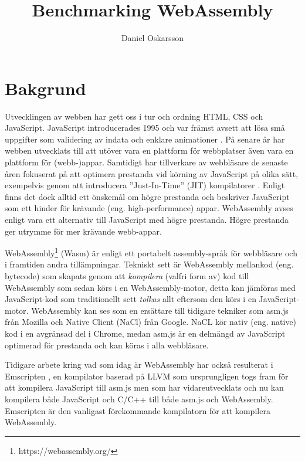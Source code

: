 \documentclass[swedish,template=rapport]{his}
\title{Benchmarking WebAssembly}
\subtitle{}
\author{Daniel Oskarsson}
\begin{document}
\maketitle

\tableofcontents

\clearpage


\section{Bakgrund}

Utvecklingen av webben har gett oss i tur och ordning HTML, CSS och JavaScript. JavaScript introducerades 1995 och var främst avsett att lösa små uppgifter som validering av indata och enklare animationer \parencite{Moller2018}. På senare år har webben utvecklats till att utöver vara en plattform för webbplatser även vara en plattform för (webb-)appar. Samtidigt har tillverkare av webbläsare de senaste åren fokuserat på att optimera prestanda vid körning av JavaScript på olika sätt, exempelvis genom att introducera ''Just-In-Time'' (JIT) kompilatorer \parencite{HerreraChenLavoieHendren2018}. Enligt \textcite{ReiserBlaser2017} finns det dock alltid ett önskemål om högre prestanda och \textcite{Zakai2018} beskriver JavaScript som ett hinder för krävande (eng. high-performance) appar. WebAssembly avses enligt \textcite{HaasRossbergSchuffTitzerHolmanGohmanWagnerZakaiBastien2017} vara ett alternativ till JavaScript med högre prestanda. Högre prestanda ger utrymme för mer krävande webb-appar.

WebAssembly\footnote{https://webassembly.org/} (Wasm) är enligt \textcite{HaasRossbergSchuffTitzerHolmanGohmanWagnerZakaiBastien2017} ett portabelt assembly-språk för webbläsare och i framtiden andra tillämpningar. Tekniskt sett är WebAssembly mellankod (eng. bytecode) som skapats genom att \emph{kompilera} (valfri form av) kod till WebAssembly \parencite{Watt2018} som sedan körs i en WebAssembly-motor, detta kan jämföras med JavaScript-kod som traditionellt sett \emph{tolkas} allt eftersom den körs i en JavaScript-motor. WebAssembly kan ses som en ersättare till tidigare tekniker som asm.js från Mozilla och Native Client (NaCl) från Google. NaCL kör nativ (eng. native) kod i en avgränsad del i Chrome, medan asm.js \parencite{Zakai2018} är en delmängd av JavaScript optimerad för prestanda \parencite{VanEsNicolayStievenartDHondtDeRoover2016} och kan köras i alla webbläsare.

Tidigare arbete kring vad som idag är WebAssembly har också resulterat i Emscripten \parencite{Zakai2011}, en kompilator baserad på LLVM \parencite{LattnerAdve2014} som ursprungligen togs fram för att kompilera JavaScript till asm.js \parencite{Zakai2011} men som har vidareutvecklats \parencite{HaasRossbergSchuffTitzerHolmanGohmanWagnerZakaiBastien2017} och nu kan kompilera både JavaScript och C/C++ till både asm.js och WebAssembly. Emscripten är den vanligast förekommande kompilatorn för att kompilera WebAssembly.
\end{document}

